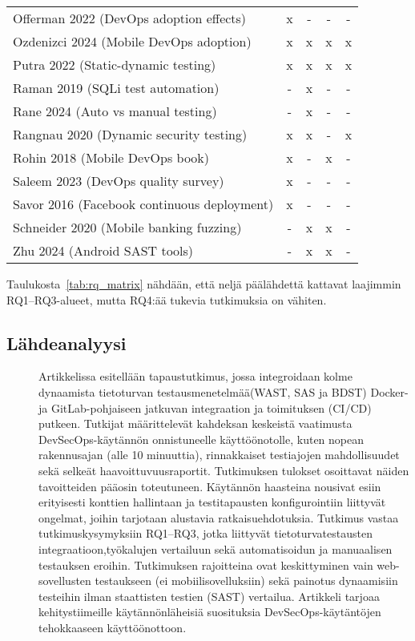 \documentclass[bscthesis,finnish,oneside,biblatex]{uefcsthesis}
\begin{document}
\begin{table}[htbp]
\begin{tabular}{p{7cm}cccc}
    Offerman 2022 (DevOps adoption effects)             &  x   &  -  &  -  &  - \\
    Ozdenizci 2024 (Mobile DevOps adoption)             &  x   &  x  &  x  &  x \\
    Putra 2022 (Static-dynamic testing)                 &  x   &  x  &  x  &  x \\
    Raman 2019 (SQLi test automation)                   &  -   &  x  &  -  &  - \\
    Rane 2024 (Auto vs manual testing)                  &  -   &  x  &  -  &  - \\
    Rangnau 2020 (Dynamic security testing)             &  x   &  x  &  -  &  x \\
    Rohin 2018 (Mobile DevOps book)                     &  x   &  -  &  x  &  - \\
    Saleem 2023 (DevOps quality survey)                 &  x   &  -  &  -  &  - \\
    Savor 2016 (Facebook continuous deployment)         &  x   &  -  &  -  &  - \\
    Schneider 2020 (Mobile banking fuzzing)             &  -   &  x  &  x  &  - \\
    Zhu 2024 (Android SAST tools)                       &  -   &  x  &  x  &  - \\
    \bottomrule
  \end{tabular}
\end{table}


Taulukosta~\ref{tab:rq_matrix} nähdään, että neljä päälähdettä
kattavat laajimmin RQ1–RQ3-alueet, mutta RQ4:ää tukevia tutkimuksia on
vähiten.

\subsection{Lähdeanalyysi}
\begin{description}
    \item[\cite{rangnau2020_cst}] Artikkelissa esitellään tapaustutkimus, jossa integroidaan kolme dynaamista tietoturvan testausmenetelmää(WAST, SAS ja BDST) Docker- ja GitLab-pohjaiseen jatkuvan integraation ja toimituksen (CI/CD) putkeen. Tutkijat määrittelevät kahdeksan keskeistä vaatimusta DevSecOps-käytännön onnistuneelle käyttöönotolle, kuten nopean rakennusajan (alle 10 minuuttia), rinnakkaiset testiajojen mahdollisuudet sekä selkeät haavoittuvuusraportit. Tutkimuksen tulokset osoittavat näiden tavoitteiden pääosin toteutuneen. Käytännön haasteina nousivat esiin erityisesti konttien hallintaan ja testitapausten konfigurointiin liittyvät ongelmat, joihin tarjotaan alustavia ratkaisuehdotuksia. Tutkimus vastaa tutkimuskysymyksiin RQ1–RQ3, jotka liittyvät tietoturvatestausten integraatioon,työkalujen vertailuun sekä automatisoidun ja manuaalisen testauksen eroihin. Tutkimuksen rajoitteina ovat keskittyminen vain web-sovellusten testaukseen (ei mobiilisovelluksiin) sekä painotus dynaamisiin testeihin ilman staattisten testien (SAST) vertailua. Artikkeli tarjoaa kehitystiimeille käytännönläheisiä suosituksia DevSecOps-käytäntöjen tehokkaaseen käyttöönottoon.
\end{description}
\end{document}
